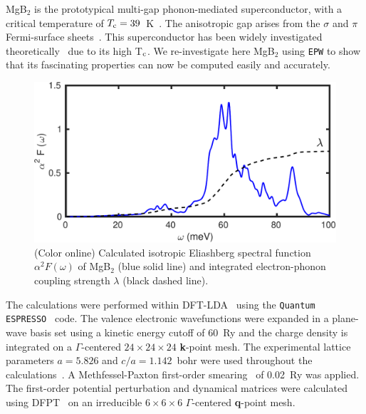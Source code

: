 \documentclass[final,3p,times,twocolumn]{elsarticle}
\newcounter{bla}
\begin{document}
MgB$_2$ is the prototypical multi-gap phonon-mediated superconductor, with a critical temperature of $T_{\rm c} = 39$~K~\cite{Nagamatsu2001}.
The anisotropic gap arises from the $\sigma$ and $\pi$ Fermi-surface sheets~\cite{Kortus2001, Liu2001, Giubileo2001, Choi2002, Choi2002a, Floris2005}.
This superconductor has been widely investigated theoretically~\cite{Hinks2000,Kortus2001,Bouquet2001,Yang2001,Wang2001,Choi2002,Choi2003,Soda2004,Punpocha2004,Dolgov2005,Mishonov2005,Xi2008,Choi2009,Abah2010,Aperis2015} due to its high T$_{\rm c}$.
We re-investigate here MgB$_2$ using \texttt{EPW} to show that its fascinating properties can now be computed easily and accurately. 

\begin{figure}[b!]
  \centering
  \includegraphics[width=0.99\linewidth]{MgB2_a2F.pdf}
  \caption{\label{a2F-MgB2} (Color online) Calculated isotropic Eliashberg spectral function $\alpha^2 F(\omega)$ of MgB$_2$ (blue solid line) and integrated electron-phonon coupling strength $\lambda$ (black dashed line).}
\end{figure}

The calculations were performed within DFT-LDA~\cite{Ceperley1980,Perdew1981} using the \texttt{Quantum ESPRESSO}~\cite{Giannozzi2009} code. 
The valence electronic wavefunctions were expanded in a plane-wave basis set using a kinetic energy cutoff of 60~Ry and the charge density is integrated on a $\Gamma$-centered  $24\times24\times24$ \textbf{k}-point mesh. The experimental lattice parameters $a = 5.826$ and $c/a = 1.142$~bohr were used throughout the calculations~\cite{Nagamatsu2001}. 
A Methfessel-Paxton first-order smearing~\cite{Methfessel1989} of 0.02~Ry was applied. 
The first-order potential perturbation and dynamical matrices were calculated using DFPT~\cite{Baroni1987,Gonze1997,Baroni2001} on an irreducible $6\times6\times6$ $\Gamma$-centered \textbf{q}-point mesh. 
\end{document}
